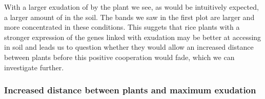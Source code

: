 \documentclass[11pt]{article}
\numberwithin{equation}{section}
\begin{document}
 With a larger exudation of  by the plant we see, as would be intuitively expected, a larger amount of  in the soil. The bands we saw in the first plot are larger and more concentrated in these conditions. This suggets that rice plants with a stronger expression of the genes linked with  exudation may be better at accessing  in soil and leads us to question whether they would allow an increased distance between plants before this positive cooperation would fade, which we can investigate further.
 
 
\subsubsection{Increased distance between plants and maximum  exudation}
\end{document}
